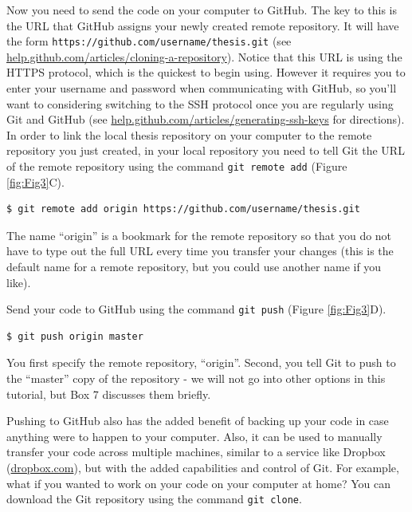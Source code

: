 \documentclass[10pt]{article}
\begin{document}
Now you need to send the code on your computer to GitHub.
The key to this is the URL that GitHub assigns your newly created remote repository.
It will have the form \verb|https://github.com/username/thesis.git| (see \href{https://help.github.com/articles/cloning-a-repository/}{help.github.com/articles/cloning-a-repository}).
Notice that this URL is using the HTTPS protocol, which is the quickest to begin using.
However it requires you to enter your username and password when communicating with GitHub, so you'll want to considering switching to the SSH protocol once you are regularly using Git and GitHub (see \href{https://help.github.com/articles/generating-ssh-keys/}{help.github.com/articles/generating-ssh-keys} for directions).
In order to link the local thesis repository on your computer to the remote repository you just created, in your local repository you need to tell Git the URL of the remote repository using the command \verb|git remote add| (Figure \ref{fig:Fig3}C).

\begin{verbatim}
$ git remote add origin https://github.com/username/thesis.git
\end{verbatim}

The name ``origin'' is a bookmark for the remote repository so that you do not have to type out the full URL every time you transfer your changes (this is the default name for a remote repository, but you could use another name if you like).

Send your code to GitHub using the command \verb|git push| (Figure \ref{fig:Fig3}D).

\begin{verbatim}
$ git push origin master
\end{verbatim}

You first specify the remote repository, ``origin''.
Second, you tell Git to push to the ``master'' copy of the repository - we will not go into other options in this tutorial, but Box 7 discusses them briefly.

Pushing to GitHub also has the added benefit of backing up your code in case anything were to happen to your computer.
Also, it can be used to manually transfer your code across multiple machines, similar to a service like Dropbox (\href{www.dropbox.com}{dropbox.com}), but with the added capabilities and control of Git.
For example, what if you wanted to work on your code on your computer at home?
You can download the Git repository using the command \verb|git clone|.
\end{document}
